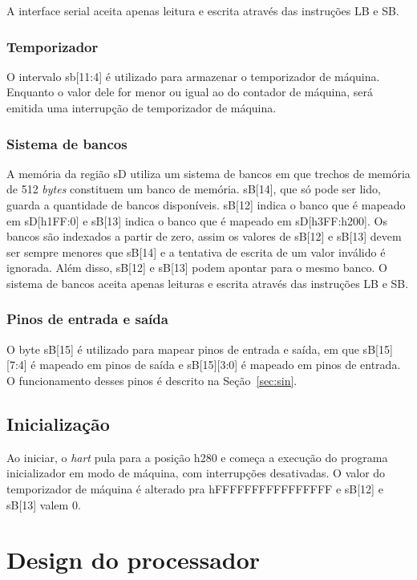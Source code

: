 A interface serial aceita apenas leitura e escrita através das instruções LB e SB.

\subsubsection{Temporizador}
\label{ssec:timerm}

O intervalo sb[11:4] é utilizado para armazenar o temporizador de máquina. Enquanto o valor dele for menor ou igual ao do contador de máquina,
será emitida uma interrupção de temporizador de máquina.

\subsubsection{Sistema de bancos}
\label{ssec:bancos}

A memória da região sD utiliza um sistema de bancos em que trechos de memória de 512 \emph{bytes} constituem um banco de memória. 
sB[14], que só pode ser lido,
guarda a quantidade de bancos disponíveis. 
sB[12] indica o banco que é mapeado em sD[h1FF:0] e sB[13] indica o banco que é
mapeado em sD[h3FF:h200]. Os bancos são indexados a partir de zero, assim os valores de sB[12] e sB[13] devem ser sempre menores que sB[14] e a tentativa de
escrita de um valor inválido é ignorada. Além disso, sB[12] e sB[13] podem apontar para o mesmo banco.
O sistema de bancos aceita apenas leituras e escrita através das instruções LB e SB.

\subsubsection{Pinos de entrada e saída}
\label{ssec:gpio}

O byte sB[15] é utilizado para mapear pinos de entrada e saída, em que sB[15][7:4] é mapeado em pinos de saída e sB[15][3:0] é mapeado em pinos de entrada.
O funcionamento desses pinos é descrito na Seção~\ref{sec:sin}.

\subsection{Inicialização}
\label{ssec:init}

Ao iniciar, o \emph{hart} pula para a posição h280 e começa a execução do programa inicializador em modo de máquina, com interrupções desativadas.
O valor do temporizador de máquina é alterado pra hFFFFFFFFFFFFFFFF e sB[12] e sB[13] valem 0.

\section{Design do processador}
\label{sec:ddp}

